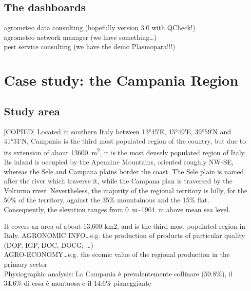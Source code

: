 \documentclass[authoryear,preprint,review,12pt]{elsarticle}
\begin{document}
\subsection{The dashboards}
agrometeo data consulting (hopefully version 3.0 with QCheck!)\\
agrometeo network manager (we have something\ldots)\\
pest service consulting (we have the demo Plasmopara!!!)\\

\section{Case study: the Campania Region}
\subsection{Study area}
[COPIED] Located in southern Italy between \ang{13;45;}E, \ang{15;49;}E, \ang{39;59;}N and \ang{41;31;}N, Campania is the third most populated region of the country, but due to its extension of about \SI{13600}{\metre\squared}, it is the most densely populated region of Italy.
Its inland is occupied by the Apennine Mountains, oriented roughly NW-SE, whereas the Sele and Campana plains border the coast.
The Sele plain is named after the river which traverse it, while the Campana plan is traversed by the Volturno river.
Nevertheless, the majority of the regional territory is hilly, for the 50\% of the territory, against the 35\% mountainous and the 15\% flat.
Consequently, the elevation ranges from \SIrange{0}{1904}{\metre} above mean sea level.

    It covers an area of about 13,600 km2, and is the third most populated region in Italy.
    AGRONOMIC INFO\dots e.g. the production of products of particular quality (DOP, IGP, DOC, DOCG; \dots)\\
    AGRO-ECONOMY\dots e.g. the ecomic value of the regional production in the primary sector\\
    Physiographic analysis: La Campania è prevalentemente collinare (50.8\%), il 34.6\% di essa è montuosa e il 14.6\% pianeggiante\\
    
\end{document}
